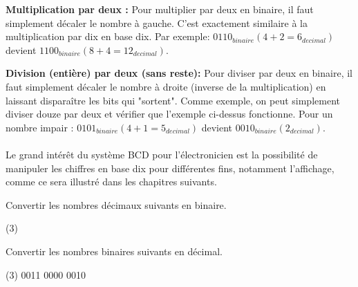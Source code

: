 \documentclass[a4paper,11pt]{book}
\theoremstyle{definition}
\begin{document}
\textbf{Multiplication par deux :} Pour multiplier par deux en binaire, il faut simplement décaler le nombre à gauche. C'est exactement similaire à la multiplication par dix en base dix. Par exemple: $0110_{binaire} (4 + 2 = 6_{decimal})$ devient $1100_{binaire} (8 + 4 = 12_{decimal})$.

\textbf{Division (entière) par deux (sans reste):} Pour diviser par deux en binaire, il faut simplement décaler le nombre à droite (inverse de la multiplication) en laissant disparaître les bits qui "sortent". Comme exemple, on peut simplement diviser douze par deux et vérifier que l'exemple ci-dessus fonctionne. Pour un nombre impair : $0101_{binaire} (4 + 1 = 5_{decimal})$ devient $0010_{binaire} (2_{decimal})$.
\\
\\
Le grand intérêt du système BCD pour l’électronicien est la possibilité de
manipuler les chiffres en base dix pour différentes fins, notamment l’affichage, comme ce sera illustré dans les chapitres suivants.

\begin{exercise}
    Convertir les nombres décimaux suivants en binaire.
    \begin{tasks}(3)
    \end{tasks}
\end{exercise}

\begin{exercise}
    Convertir les nombres binaires suivants en décimal.
    \begin{tasks}(3)
         0011
         0000
         0010
    \end{tasks}
\end{exercise}
\end{document}
